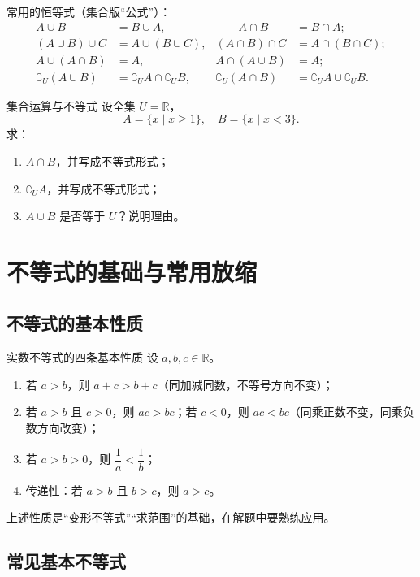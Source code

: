 \documentclass[a4paper,11pt]{ctexart}
\begin{document}
常用的恒等式（集合版“公式”）：
\[
\begin{aligned}
A\cup B &= B\cup A,&\qquad A\cap B &= B\cap A;\\
(A\cup B)\cup C &= A\cup(B\cup C),&
(A\cap B)\cap C &= A\cap(B\cap C);\\
A\cup(A\cap B) &= A,& A\cap(A\cup B)&=A;\\
\complement_U(A\cup B)&=\complement_U A\cap\complement_U B,&
\complement_U(A\cap B)&=\complement_U A\cup\complement_U B.
\end{aligned}
\]

\begin{examplebox}{集合运算与不等式}
设全集 $U=\mathbb{R}$，
\[
A=\{x\mid x\ge 1\},\quad B=\{x\mid x<3\}.
\]
求：
\begin{enumerate}
  \item $A\cap B$，并写成不等式形式；
  \item $\complement_U A$，并写成不等式形式；
  \item $A\cup B$ 是否等于 $U$？说明理由。
\end{enumerate}
\end{examplebox}

\section{不等式的基础与常用放缩}

\subsection{不等式的基本性质}

\begin{summarybox}{实数不等式的四条基本性质}
设 $a,b,c\in\mathbb{R}$。
\begin{enumerate}
  \item 若 $a>b$，则 $a+c>b+c$（同加减同数，不等号方向不变）；
  \item 若 $a>b$ 且 $c>0$，则 $ac>bc$；若 $c<0$，则 $ac<bc$（同乘正数不变，同乘负数方向改变）；
  \item 若 $a>b>0$，则 $\dfrac{1}{a}<\dfrac{1}{b}$；
  \item 传递性：若 $a>b$ 且 $b>c$，则 $a>c$。
\end{enumerate}
上述性质是“变形不等式”“求范围”的基础，在解题中要熟练应用。
\end{summarybox}

\subsection{常见基本不等式}
\end{document}
